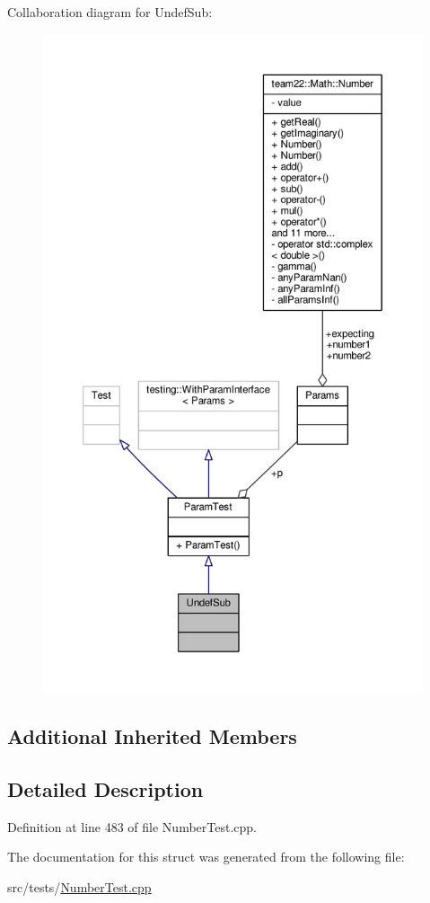 Collaboration diagram for Undef\+Sub\+:
\nopagebreak
\begin{figure}[H]
\begin{center}
\leavevmode
\includegraphics[height=550pt]{struct_undef_sub__coll__graph}
\end{center}
\end{figure}
\subsection*{Additional Inherited Members}


\subsection{Detailed Description}


Definition at line 483 of file Number\+Test.\+cpp.



The documentation for this struct was generated from the following file\+:\begin{DoxyCompactItemize}
\item 
src/tests/\hyperlink{_number_test_8cpp}{Number\+Test.\+cpp}\end{DoxyCompactItemize}
